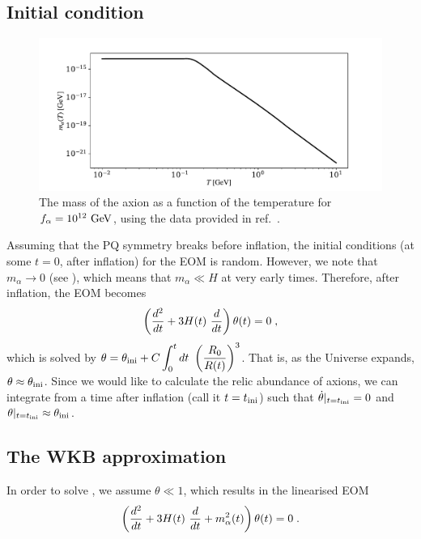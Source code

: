 \documentclass[11pt,a4paper]{article}
\begin{document}
\subsection*{Initial condition}
%
\begin{figure}[h!]
	\includegraphics[width=1\textwidth]{figs/axion_mass.pdf}
	\caption{The mass of the axion as a function of the temperature for $f_{\alpha}{}=10^{12}~{\rm GeV}$, using the data provided in ref.~\cite{Borsanyi:2016ksw}.}
	\label{fig:axion_mass}
\end{figure}
%
Assuming that the PQ symmetry breaks before inflation, the initial conditions (\ie at some $t=0$, after inflation) for the EOM is random. However, we note that $m_{\alpha} \to 0$ (see ), which means that $m_{\alpha} \ll H$ at very early times. Therefore, after inflation, the EOM becomes
%
\begin{equation}
	\left( \dfrac{d^2}{d t} + 3 H(t) \ \dfrac{d}{d t}   \right) \theta(t) = 0 \; ,
	\label{eq:massless_eom}
\end{equation}
%
which is solved by $\theta = \theta_{\rm ini}{} + C \displaystyle \int_{0}^t d t \ \left(  \dfrac{R_{0}}{R(t)}  \right)^3$. That is, as the Universe expands, $\theta \approx \theta_{\rm ini}{}$. Since we would like to calculate the relic abundance of axions, we can integrate  from a time after inflation (call it $t = t_{\rm ini}{}$) such that $ \dot \theta |_{t=t_{\rm ini}{}} = 0$ and  $\theta|_{t=t_{\rm ini}{}} \approx \theta_{\rm ini}{}$.   



\subsection{The WKB approximation}
%
In order to solve , we assume $\theta \ll 1$, which results in the linearised EOM
%
\begin{equation}
	\left( \dfrac{d^2}{d t} + 3 H(t) \ \dfrac{d}{d t} + m_{\alpha}^2(t)  \right) \theta(t) = 0 \; .
	\label{eq:linear_eom}
\end{equation}
\end{document}
